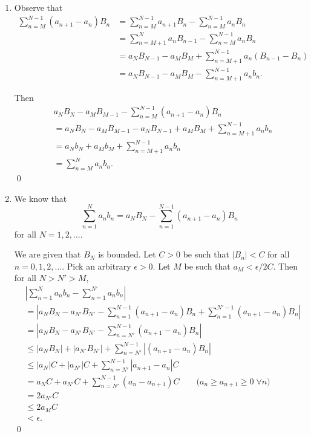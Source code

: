 \documentclass[oneside]{article}
\newcommand\abs[1]{\left|#1\right|}
\begin{document}
  \begin{enumerate}[label=(\alph*)]
    \item
      Observe that \begin{align*}
        \sum_{n=M}^{N-1} (a_{n+1} - a_n)B_n
        &= \sum_{n=M}^{N-1} a_{n+1}B_n - \sum_{n=M}^{N-1} a_nB_n \\
        &= \sum_{n=M+1}^{N} a_{n}B_{n-1} - \sum_{n=M}^{N-1} a_nB_n \\
        &= a_NB_{N-1} - a_MB_M + \sum_{n=M+1}^{N-1} a_{n}(B_{n-1} - B_n) \\
        &= a_NB_{N-1} - a_MB_M - \sum_{n=M+1}^{N-1} a_nb_n \text{.}
      \end{align*}

      Then \begin{align*}
        &a_NB_N - a_MB_{M-1} - \sum_{n=M}^{N-1}(a_{n+1}-a_n)B_n \\
        &= a_NB_N - a_MB_{M-1} - a_NB_{N-1} + a_MB_M
        + \sum_{n=M+1}^{N-1} a_nb_n \\
        &= a_Nb_N + a_Mb_M + \sum_{n=M+1}^{N-1} a_nb_n \\
        &= \sum_{n=M}^{N} a_nb_n \text{.}
      \end{align*}\qed

    \item
      We know that \[
        \sum_{n=1}^N a_nb_n = a_NB_N - \sum_{n=1}^{N-1}(a_{n+1}-a_n)B_n
      \] for all $N = 1, 2, \dots$.

      We are given that $B_N$ is bounded. Let $C > 0$ be such that
      $\abs{B_n} < C$ for all $n = 0, 1, 2, \dots$. Pick an arbitrary
      $\epsilon > 0$. Let $M$ be such that $a_M < \epsilon/2C$. Then for all
      $N > N' > M$, \begin{align*}
        &\abs{\sum_{n=1}^{N} a_nb_n - \sum_{n=1}^{N'} a_nb_n} \\
        &= \abs{a_{N}B_{N} - a_{N'}B_{N'} - \sum_{n=1}^{N-1}(a_{n+1}-a_n)B_n
        + \sum_{n=1}^{N'-1}(a_{n+1}-a_n)B_n} \\
        &= \abs{a_{N}B_{N} - a_{N'}B_{N'} - \sum_{n=N'}^{N-1}(a_{n+1}-a_n)B_n} \\
        &\leq \abs{a_{N}B_{N}} + \abs{a_{N'}B_{N'}}
        + \sum_{n=N'}^{N-1}\abs{(a_{n+1}-a_n)B_n} \\
        &\leq \abs{a_{N}}C + \abs{a_{N'}}C
        + \sum_{n=N'}^{N-1}\abs{a_{n+1}-a_n}C \\
        &= a_{N}C + a_{N'}C + \sum_{n=N'}^{N-1}(a_n - a_{n+1})C
        \qquad\text{($a_n \geq a_{n+1} \geq 0 \;\forall n$)}\\
        &= 2a_{N'}C \\
        &\leq 2a_MC \\
        &< \epsilon\text{.}
      \end{align*} \qed

  \end{enumerate}
\end{document}
